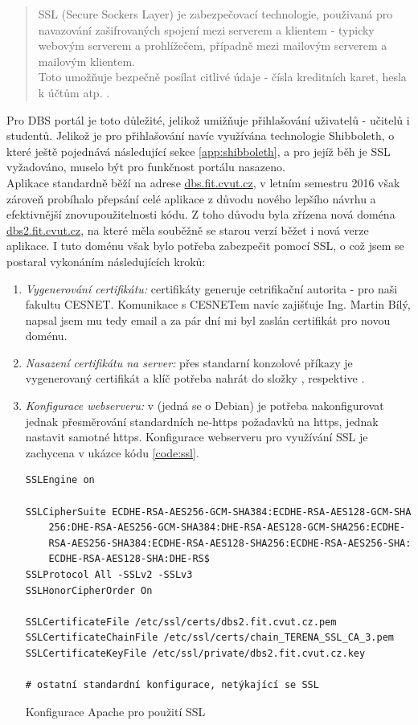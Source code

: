 \begin{quote}
SSL (Secure Sockers Layer) je zabezpečovací technologie, použivaná pro navazování zašifrovaných spojení mezi serverem a klientem - typicky webovým serverem a prohlížečem, případně mezi mailovým serverem a mailovým klientem.\\
Toto umožňuje bezpečně posílat citlivé údaje - čísla kreditních karet, hesla k účtům atp. \cite{ssl}.
\end{quote}
Pro DBS portál je toto důležité, jelikož umižňuje přihlašování uživatelů - učitelů i studentů. Jelikož je pro přihlašování navíc využívána technologie Shibboleth, o které ještě pojednává následující sekce \ref{app:shibboleth}, a pro jejíž běh je SSL vyžadováno, muselo být pro funkčnost portálu nasazeno.\\
Aplikace standardně běží na adrese \url{dbs.fit.cvut.cz}, v letním semestru 2016 však zároveň probíhalo přepsání celé aplikace z důvodu nového lepšího návrhu a efektivnější znovupoužitelnosti kódu. Z toho důvodu byla zřízena nová doména \url{dbs2.fit.cvut.cz}, na které měla souběžně se starou verzí běžet i nová verze aplikace. I tuto doménu však bylo potřeba zabezpečit pomocí SSL, o což jsem se postaral vykonáním následujících kroků:
\begin{enumerate}
	\item \emph{Vygenerování certifikátu:} certifikáty generuje cetrifikační autorita - pro naši fakultu CESNET. Komunikace s CESNETem navíc zajišťuje Ing. Martin Bílý, napsal jsem mu tedy email a za pár dní mi byl zaslán certifikát pro novou doménu.
	\item \emph{Nasazení certifikátu na server:} přes standarní konzolové příkazy je vygenerovaný certifikát a klíč potřeba nahrát do složky , respektive .
	\item \emph{Konfigurace webserveru:} v  (jedná se o Debian) je potřeba nakonfigurovat jednak přesměrování standardních ne-https požadavků na https, jednak nastavit samotné https. Konfigurace  webserveru pro využívání SSL je zachycena v ukázce kódu \ref{code:ssl}.
	\begin{listing}
		\expandafter\def\csname PY@tok@err\endcsname{} %
		\begin{verbatim}
SSLEngine on

SSLCipherSuite ECDHE-RSA-AES256-GCM-SHA384:ECDHE-RSA-AES128-GCM-SHA
    256:DHE-RSA-AES256-GCM-SHA384:DHE-RSA-AES128-GCM-SHA256:ECDHE-
    RSA-AES256-SHA384:ECDHE-RSA-AES128-SHA256:ECDHE-RSA-AES256-SHA:
    ECDHE-RSA-AES128-SHA:DHE-RS$
SSLProtocol All -SSLv2 -SSLv3
SSLHonorCipherOrder On

SSLCertificateFile /etc/ssl/certs/dbs2.fit.cvut.cz.pem
SSLCertificateChainFile /etc/ssl/certs/chain_TERENA_SSL_CA_3.pem
SSLCertificateKeyFile /etc/ssl/private/dbs2.fit.cvut.cz.key

# ostatní standardní konfigurace, netýkající se SSL
		\end{verbatim}
		\caption{Konfigurace Apache pro použití SSL} \label{code:ssl}
	\end{listing}
\end{enumerate}

